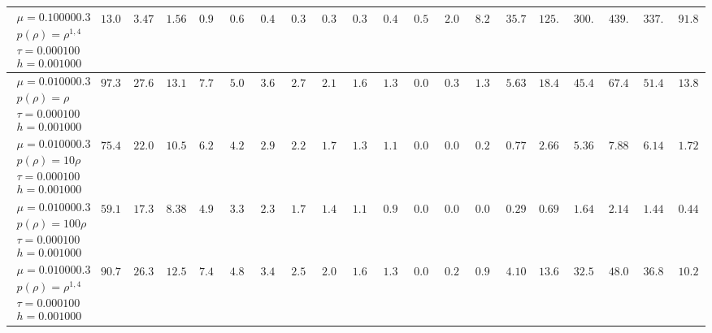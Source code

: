 \begin{landscape}
\begin{tabular}{*{19}{|c}|c}
\hline
$\begin{array}{c}\mu = 0.100000.3\\p(\rho) = \rho^{1,4}\\\tau = 0.000100\\h = 0.001000\end{array}$&$13.099000$ &$3.478500$ &$1.565500$ &$0.943400$ &$0.619500$ &$0.435000$ &$0.342100$ &$0.384800$ &$0.394700$ &$0.404400$ &$0.544900$ &$2.030300$ &$8.210200$ &$35.738500$ &$125.412800$ &$300.706100$ &$439.795700$ &$337.592500$ &$91.898300$ \\
\hline
$\begin{array}{c}\mu = 0.010000.3\\p(\rho) = \rho\\\tau = 0.000100\\h = 0.001000\end{array}$&$97.354900$ &$27.687900$ &$13.132400$ &$7.733600$ &$5.086800$ &$3.660000$ &$2.713900$ &$2.125300$ &$1.672600$ &$1.354500$ &$0.076400$ &$0.313400$ &$1.322800$ &$5.634600$ &$18.454700$ &$45.454200$ &$67.455800$ &$51.415000$ &$13.885600$ \\
\hline
$\begin{array}{c}\mu = 0.010000.3\\p(\rho) = 10\rho\\\tau = 0.000100\\h = 0.001000\end{array}$&$75.406600$ &$22.051200$ &$10.590700$ &$6.283300$ &$4.204500$ &$2.977300$ &$2.236000$ &$1.719800$ &$1.388200$ &$1.123300$ &$0.018000$ &$0.063600$ &$0.255400$ &$0.778800$ &$2.667800$ &$5.360700$ &$7.883000$ &$6.148700$ &$1.725000$ \\
\hline
$\begin{array}{c}\mu = 0.010000.3\\p(\rho) = 100\rho\\\tau = 0.000100\\h = 0.001000\end{array}$&$59.150100$ &$17.375200$ &$8.383600$ &$4.987800$ &$3.350300$ &$2.392000$ &$1.793200$ &$1.406600$ &$1.117100$ &$0.905400$ &$0.020400$ &$0.084600$ &$0.098800$ &$0.298500$ &$0.698500$ &$1.648500$ &$2.148100$ &$1.448300$ &$0.448100$ \\
\hline
$\begin{array}{c}\mu = 0.010000.3\\p(\rho) = \rho^{1,4}\\\tau = 0.000100\\h = 0.001000\end{array}$&$90.764000$ &$26.359700$ &$12.507800$ &$7.476300$ &$4.808800$ &$3.444700$ &$2.590800$ &$2.052700$ &$1.637800$ &$1.311300$ &$0.058900$ &$0.233300$ &$0.979900$ &$4.106900$ &$13.677700$ &$32.516300$ &$48.095000$ &$36.806200$ &$10.287000$ \\

\end{tabular}
\end{landscape}
